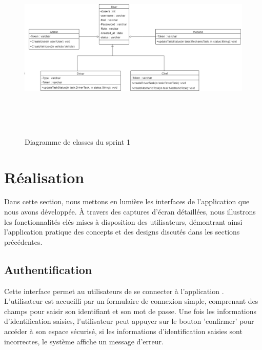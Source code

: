 \begin{figure}[ht!]

  \centering
  \includegraphics[width=1\textwidth,height=9cm]{chap3.images/class sprint 1.png}
  \caption{Diagramme de classes du sprint 1}

\end{figure}

\newpage
\section{ Réalisation}

Dans cette section, nous mettons en lumière les interfaces  de l'application que nous avons développée. À travers des captures d'écran détaillées, nous illustrons les fonctionnalités clés mises à disposition des utilisateurs, démontrant ainsi l'application pratique des concepts et des designs discutés dans les sections précédentes.



\subsection{Authentification}
Cette interface permet au utilisateurs de se connecter à l'application . L'utilisateur est accueilli par un formulaire de connexion simple, comprenant des champs pour saisir son identifiant et son mot de passe. Une fois les informations d'identification saisies, l'utilisateur peut appuyer sur le bouton  'confirmer' pour accéder à son espace sécurisé, si les informations d'identification saisies sont incorrectes, le système affiche un message d'erreur. \\


